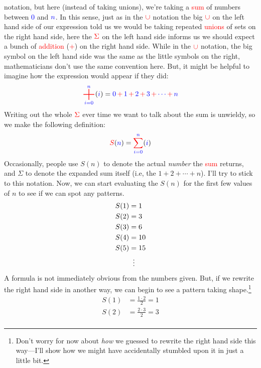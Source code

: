 \documentclass[10pt]{article}
\newcommand{\cvdots}[1][=]{\mathrel{\makebox[\widthof{#1}]{\vdots}}}
\DeclareMathOperator*{\bigplus}{\text{\fontsize{25}{35}\selectfont $+$}}
\theoremstyle{definition}
\begin{document}
{notation, but here (instead of taking unions), we're taking a
\textcolor{red}{sum} of numbers between \textcolor{blue}{0} and
$\textcolor{blue}{n}$.  In this sense, just as in the
$\color{red}\cup$ notation the big $\color{red}\cup$ on the left hand
side of our expression told us we would be taking repeated
\textcolor{red}{unions} of sets on the right hand side, here the
$\color{red}\Sigma$ on the left hand side informs us we should expect
a bunch of \textcolor{red}{addition} (\textcolor{red}{+}) on the right
hand side.  While in the $\color{red}\cup$ notation, the big symbol on
the left hand side was the same as the little symbols on the right,
mathematicians don't use the same convention here.  But, it might be
helpful to imagine how the expression would appear if they did:
\[\raisebox{-.45\depth}{$\displaystyle\color{red}\bigplus^{{\color{blue}n}}_{{\color{blue}i=0}}$}
  ({\color{blue}i}) = \textcolor{blue}{0}
  \,{\color{red}+}\,\textcolor{blue}{1} \,{\color{red}+}\,
  \textcolor{blue}{2} \,{\color{red}+}\, \textcolor{blue}{3}
  \,{\color{red}+}\, \textcolor{blue}{\cdots} \,{\color{red}+}\,
  \textcolor{blue}{n}\]
Writing out the whole $\textcolor{red}{\Sigma}$ ever time we want to talk about the sum is unwieldy, so we make the following definition:
\[\textcolor{red}{S}(\textcolor{blue}{n}) =
  {\color{red}\sum^{{\color{blue}n}}_{\color{blue} i=0}}
  ({\color{blue}i})\]
Occasionally, people use $S(n)$ to denote the actual \emph{number} the
\textcolor{red}{sum} returns, and $\Sigma$ to denote the expanded sum
itself (i.e, the $1+2+\cdots+n$).  I'll try to stick to this notation.
Now, we can start evaluating the $S(n)$ for the first few values of
$n$ to see if we can spot any patterns.
\begin{align*}
S(1) &= 1 \\
S(2) &= 3 \\
S(3) &= 6 \\
S(4) &= 10 \\
S(5) &= 15 \\
&\cvdots
\end{align*}
A formula is not immediately obvious from the numbers given.  But, if
we rewrite the right hand side in another way, we can begin to see a
pattern taking shape.\footnote{Don't worry for now about \emph{how} we
  guessed to rewrite the right hand side this way---I'll show how we
  might have accidentally stumbled upon it in just a little bit.}
\begin{align*}
S(1) &= \frac{1\cdot2}{2} = 1\\
S(2) &= \frac{2\cdot3}{2} = 3\\

\end{align*}}
\end{document}
